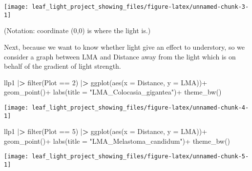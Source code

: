 \documentclass[
]{article}
\newenvironment{Shaded}{\begin{snugshade}}{\end{snugshade}}
\newcommand{\AttributeTok}[1]{\textcolor[rgb]{0.77,0.63,0.00}{#1}}
\newcommand{\DecValTok}[1]{\textcolor[rgb]{0.00,0.00,0.81}{#1}}
\newcommand{\ErrorTok}[1]{\textcolor[rgb]{0.64,0.00,0.00}{\textbf{#1}}}
\newcommand{\FunctionTok}[1]{\textcolor[rgb]{0.00,0.00,0.00}{#1}}
\newcommand{\NormalTok}[1]{#1}
\newcommand{\SpecialCharTok}[1]{\textcolor[rgb]{0.00,0.00,0.00}{#1}}
\newcommand{\StringTok}[1]{\textcolor[rgb]{0.31,0.60,0.02}{#1}}
\begin{document}
\begin{center}\texttt{[image: leaf\_light\_project\_showing\_files/figure-latex/unnamed-chunk-3-1]} \end{center}

(Notation: coordinate (0,0) is where the light is.)

Next, because we want to know whether light give an effect to
understory, so we consider a graph between LMA and Distance away from
the light which is on behalf of the gradient of light strength.

\begin{Shaded}
\begin{Highlighting}[]
\NormalTok{llp1 }\SpecialCharTok{|}\ErrorTok{\textgreater{}} 
  \FunctionTok{filter}\NormalTok{(Plot }\SpecialCharTok{==} \DecValTok{2}\NormalTok{) }\SpecialCharTok{|}\ErrorTok{\textgreater{}}
\FunctionTok{ggplot}\NormalTok{(}\FunctionTok{aes}\NormalTok{(}\AttributeTok{x =}\NormalTok{ Distance, }\AttributeTok{y =}\NormalTok{ LMA))}\SpecialCharTok{+}
  \FunctionTok{geom\_point}\NormalTok{()}\SpecialCharTok{+}
  \FunctionTok{labs}\NormalTok{(}\AttributeTok{title =} \StringTok{"LMA\_Colocasia\_gigantea"}\NormalTok{)}\SpecialCharTok{+}
  \FunctionTok{theme\_bw}\NormalTok{()}
\end{Highlighting}
\end{Shaded}

\begin{center}\texttt{[image: leaf\_light\_project\_showing\_files/figure-latex/unnamed-chunk-4-1]} \end{center}

\begin{Shaded}
\begin{Highlighting}[]
\NormalTok{llp1 }\SpecialCharTok{|}\ErrorTok{\textgreater{}}
  \FunctionTok{filter}\NormalTok{(Plot }\SpecialCharTok{==} \DecValTok{5}\NormalTok{) }\SpecialCharTok{|}\ErrorTok{\textgreater{}}
\FunctionTok{ggplot}\NormalTok{(}\FunctionTok{aes}\NormalTok{(}\AttributeTok{x =}\NormalTok{ Distance, }\AttributeTok{y =}\NormalTok{ LMA))}\SpecialCharTok{+}
  \FunctionTok{geom\_point}\NormalTok{()}\SpecialCharTok{+}
   \FunctionTok{labs}\NormalTok{(}\AttributeTok{title =} \StringTok{"LMA\_Melastoma\_candidum"}\NormalTok{)}\SpecialCharTok{+}
  \FunctionTok{theme\_bw}\NormalTok{()}
\end{Highlighting}
\end{Shaded}

\begin{center}\texttt{[image: leaf\_light\_project\_showing\_files/figure-latex/unnamed-chunk-5-1]} \end{center}
\end{document}
